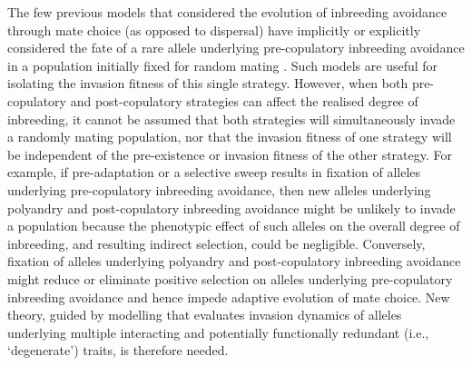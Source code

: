 \documentclass[10pt,letterpaper]{article}
\begin{document}
The few previous models that considered the evolution of inbreeding avoidance through mate choice (as opposed to dispersal) have implicitly or explicitly considered the fate of a rare allele underlying pre-copulatory inbreeding avoidance in a population initially fixed for random mating \cite[e.g.,][]{Parker1979, Parker2006, Duthie, Duthie2016a}. Such models are useful for isolating the invasion fitness of this single strategy. However, when both pre-copulatory and post-copulatory strategies can affect the realised degree of inbreeding, it cannot be assumed that both strategies will simultaneously invade a randomly mating population, nor that the invasion fitness of one strategy will be independent of the pre-existence or invasion fitness of the other strategy. For example, if pre-adaptation or a selective sweep results in fixation of alleles underlying pre-copulatory inbreeding avoidance, then new alleles underlying polyandry and post-copulatory inbreeding avoidance might be unlikely to invade a population because the phenotypic effect of such alleles on the overall degree of inbreeding, and resulting indirect selection, could be negligible. Conversely, fixation of alleles underlying polyandry and post-copulatory inbreeding avoidance might reduce or eliminate positive selection on alleles underlying pre-copulatory inbreeding avoidance and hence impede adaptive evolution of mate choice. New theory, guided by modelling that evaluates invasion dynamics of alleles underlying multiple interacting and potentially functionally redundant (i.e., `degenerate') traits, is therefore needed.
\end{document}
